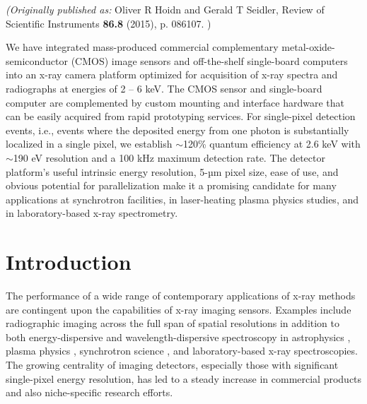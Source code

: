\emph{(Originally published as: }
Oliver R Hoidn and Gerald T Seidler, Review of Scientific Instruments {\bfseries 86.8}
(2015), p. 086107.
)

\begin{addmargin}[4em]{1em}
We have integrated mass-produced commercial complementary
metal-oxide-semiconductor (CMOS) image sensors and off-the-shelf
single-board computers into an x-ray camera platform optimized for
acquisition of x-ray spectra and radiographs at energies of 2 -- 6 keV.
The CMOS sensor and single-board computer are complemented by custom
mounting and interface hardware that can be easily acquired from rapid
prototyping services. For single-pixel detection events, i.e., events
where the deposited energy from one photon is substantially localized in
a single pixel, we establish $\sim$120\% quantum efficiency at
2.6 keV with $\sim$190 eV resolution and a 100 kHz maximum
detection rate. The detector platform's useful intrinsic energy
resolution, 5-µm pixel size, ease of use, and obvious potential for parallelization make
it a promising candidate for many applications at synchrotron
facilities, in laser-heating plasma physics studies, and in
laboratory-based x-ray spectrometry.
\end{addmargin}


\section{Introduction}
The performance of a wide range of contemporary applications of x-ray
methods are contingent upon the capabilities of x-ray imaging sensors.
Examples include radiographic imaging across the full span of spatial
resolutions in addition to both energy-dispersive and
wavelength-dispersive spectroscopy in
astrophysics , plasma
physics \cite{PLATEAU2012LOW}, synchrotron
science \cite{HUOTARI2005IMPROVING}, and
laboratory-based x-ray
spectroscopies. The
growing centrality of imaging detectors, especially those with
significant single-pixel energy resolution, has led to a steady increase
in commercial products and also niche-specific research efforts.

